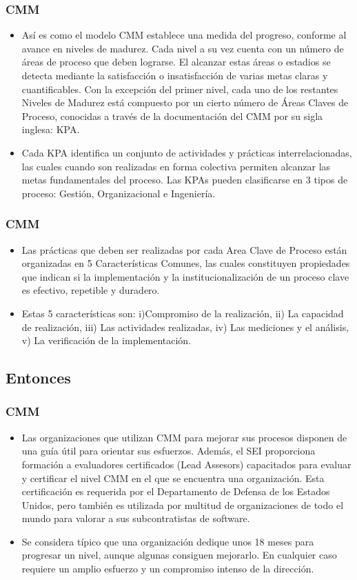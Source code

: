 \documentclass{beamer}
\begin{document}
\frame
{
	\frametitle{CMM}
	\begin{itemize}
	    \item<1-> Así es como el modelo CMM establece una medida del progreso, conforme al
avance en niveles de madurez. Cada nivel a su vez cuenta con un número de áreas
de proceso que deben lograrse. El alcanzar estas áreas o estadios se detecta
mediante la satisfacción o insatisfacción de varias metas claras y cuantificables. Con
la excepción del primer nivel, cada uno de los restantes Niveles de Madurez está
compuesto por un cierto número de Áreas Claves de Proceso, conocidas a través de
la documentación del CMM por su sigla inglesa: KPA.


    	\item<2-> Cada KPA identifica un conjunto de actividades y prácticas interrelacionadas, las
cuales cuando son realizadas en forma colectiva permiten alcanzar las metas
fundamentales del proceso. Las KPAs pueden clasificarse en 3 tipos de proceso:
Gestión, Organizacional e Ingeniería.

	\end{itemize}
}

\frame
{
  \frametitle{CMM}
  \begin{itemize}
    \item<1-> Las prácticas que deben ser realizadas por cada Area Clave de Proceso están organizadas en 5 Características Comunes, las cuales constituyen propiedades que indican si la implementación y la institucionalización de un proceso clave es efectivo, repetible y duradero.

    \item<2-> Estas 5 características son: i)Compromiso de la realización, ii) La capacidad de realización, iii) Las actividades realizadas, iv) Las mediciones y el análisis, v) La verificación de la implementación.

  \end{itemize}
}

\subsection{Entonces}

\frame
{
  \frametitle{CMM}
  \begin{itemize}
    \item<1-> Las organizaciones que utilizan CMM para mejorar sus procesos disponen de una guía útil para orientar sus esfuerzos. Además, el SEI proporciona formación a evaluadores certificados (Lead Assesors) capacitados para evaluar y certificar el nivel CMM en el que se encuentra una organización. Esta certificación es requerida por el Departamento de Defensa de los Estados Unidos, pero también es utilizada por multitud de organizaciones de todo el mundo para valorar a sus subcontratistas de software.
    \item<2-> Se considera típico que una organización dedique unos 18 meses para progresar un nivel, aunque algunas consiguen mejorarlo. En cualquier caso requiere un amplio esfuerzo y un compromiso intenso de la dirección.
  \end{itemize}
}
\end{document}
